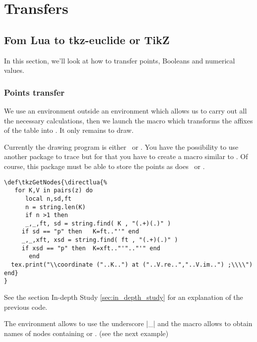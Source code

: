 
\newpage
\section{Transfers} %
\label{sec:transfers}
\subsection{Fom Lua to tkz-euclide or TikZ} %
\label{sub:fom_lua_to_tkz_euclide_or_tikz}

In this section, we'll look at how to transfer points, Booleans and numerical values.

\subsubsection{Points transfer} %
\label{ssub:points_transfer}
We use an environment   outside an environment  which allows us to carry out all the necessary calculations, then we launch the macro  which transforms the affixes of the table  into  . It only remains to draw.

Currently the drawing program is either \TIKZ\ or . You have the possibility to use another package to trace but for that you have to create a macro similar to . Of course, this package must be able to store the points as does \TIKZ\ or . 

\vspace*{1em}

\begin{mybox}
\begin{verbatim}
\def\tkzGetNodes{\directlua{%
   for K,V in pairs(z) do
      local n,sd,ft
      n = string.len(K)
      if n >1 then
      _,_,ft, sd = string.find( K , "(.+)(.)" )  
     if sd == "p" then   K=ft.."'" end 
     _,_,xft, xsd = string.find( ft , "(.+)(.)" ) 
     if xsd == "p" then  K=xft.."'".."'" end 
       end    
  tex.print("\\coordinate ("..K..") at ("..V.re..","..V.im..") ;\\\\")
end}
}
\end{verbatim}
\end{mybox}
See the section In-depth Study \ref{sec:in_depth_study} for an explanation of the previous code.

The environment  allows to use the underscore |_| and the macro  allows to obtain names of nodes containing  or . (see the next example)

